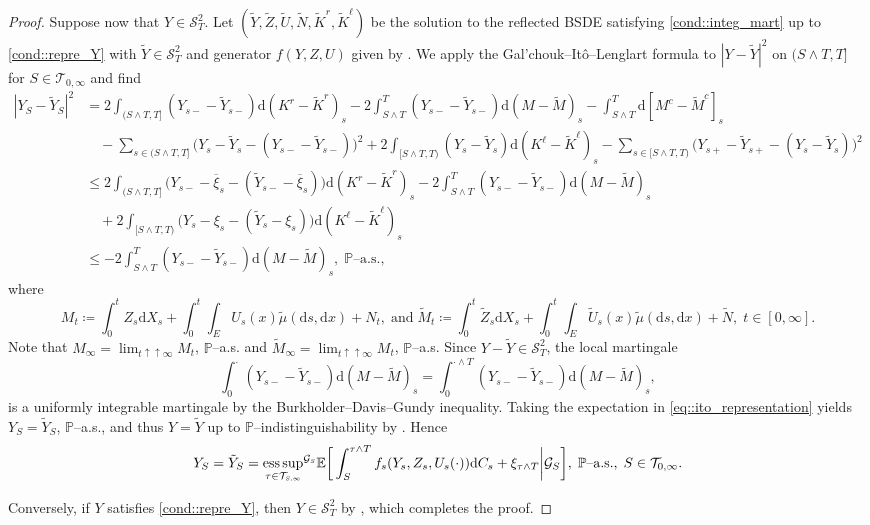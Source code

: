 \documentclass[10pt]{article} %
\newcommand\cG{\mathcal G}
\newcommand\cS{\mathcal S}
\newcommand\cT{\mathcal T}
\newcommand{\smalltext}[1]{\text{\fontsize{4}{4}\selectfont$#1$}}
\def \E{\mathbb{E}}
\def \P{\mathbb{P}}
\def\d{\mathrm{d}}
\DeclareMathOperator*{\esssup}{ess\,sup}
\begin{document}
\begin{proof}
	\medskip
	Suppose now that $Y \in \cS^2_T$. Let $(\tilde Y,\tilde Z, \tilde U, \tilde N, \tilde K^r, \tilde K^\ell)$ be the solution to the reflected BSDE satisfying \ref{cond::integ_mart} up to \ref{cond::repre_Y} with $\tilde Y \in \cS^2_T$ and generator $f(Y,Z,U)$ given by . We apply the Gal'chouk--It\^o--Lenglart formula to $|Y - \tilde Y|^2$ on $(S\land T,T]$ for $S \in \cT_{0,\infty}$ and find
	\begin{align}\label{eq::ito_representation}
			|Y_S - \tilde Y_S|^2 
			&= 2 \int_{(S \land T,T]} (Y_{s-}-\tilde Y_{s-}) \d (K^r - \tilde K^r)_s - 2 \int_{S \land T}^T (Y_{s-}-\tilde Y_{s-}) \d (M - \tilde M)_s - \int_{S \land T}^T \d [M^c - \tilde M^c]_s \nonumber \\
			& \quad - \sum_{s \in (S \land T,T]} \big( Y_s - \tilde Y_s  - (Y_{s-} - \tilde Y_{s-})\big)^2 + 2 \int_{[S \land T,T)} (Y_s - \tilde Y_s) \d (K^\ell - \tilde K^\ell)_s - \sum_{s \in [S \land T,T)} \big( Y_{s+} - \tilde Y_{s+} - (Y_s - \tilde Y_s)\big)^2 \nonumber \\
			&\leq 2 \int_{(S \land T,T]} \big(Y_{s-} - \overline\xi_s - (\tilde Y_{s-}-\overline\xi_s)\big) \d (K^r - \tilde K^r)_s - 2 \int_{S \land T}^T (Y_{s-}-\tilde Y_{s-}) \d (M - \tilde M)_s \nonumber \\
			& \quad +2 \int_{[S \land T,T)} \big(Y_s - \xi_s - (\tilde Y_s-\xi_s)\big) \d (K^\ell - \tilde K^\ell)_s \nonumber \\
			&\leq - 2 \int_{S \land T}^T (Y_{s-}-\tilde Y_{s-}) \d (M - \tilde M)_s, \; \text{$\P$--a.s.,}
	\end{align}
	where
	\begin{equation*}
		M_t \coloneqq \int_0^t Z_s \d X_s + \int_0^t\int_E U_s(x)\tilde\mu(\d s, \d x) + N_t, \; 
		\text{and} 
		\; \tilde M_t \coloneqq \int_0^t \tilde Z_s \d X_s + \int_0^t\int_E \tilde U_s(x)\tilde\mu(\d s, \d x) + \tilde N, \; t \in [0,\infty].
	\end{equation*}	
	Note that $M_\infty = \lim_{t \uparrow\uparrow \infty}M_t$, $\P$--a.s. and $\tilde M_\infty =\lim_{t \uparrow\uparrow \infty}M_t$, $\P$--a.s.	Since $Y- \tilde Y \in \cS^2_T$, the local martingale
	\begin{equation*}
		\int_0^\cdot (Y_{s-}-\tilde Y_{s-}) \d (M - \tilde M)_s = \int_0^{\cdot \land T} (Y_{s-}-\tilde Y_{s-}) \d (M - \tilde M)_s,
	\end{equation*}
	is a uniformly integrable martingale by the Burkholder--Davis--Gundy inequality. Taking the expectation in \eqref{eq::ito_representation} yields $Y_S = \tilde Y_S$, $\P$--a.s., and thus $Y = \tilde Y$ up to $\P$--indistinguishability by . Hence
	\begin{equation*}
		Y_S = \tilde Y_S = {\esssup_{\tau \in \cT_{\smalltext{S}\smalltext{,}\smalltext{\infty}}}}^{\cG_\smalltext{S}} \E\bigg[ \int_S^{\tau \land T} f_s(Y_s,Z_s,U_s(\cdot)) \d C_s + \xi_{\tau \land T} \bigg| \cG_S\bigg], \;\text{$\P$--a.s.}, \; S \in \cT_{0,\infty}.
	\end{equation*}
	
	\medskip
	Conversely, if $Y$ satisfies \ref{cond::repre_Y},  then $Y \in \cS^2_T$ by , which completes the proof.
\end{proof}
\end{document}
